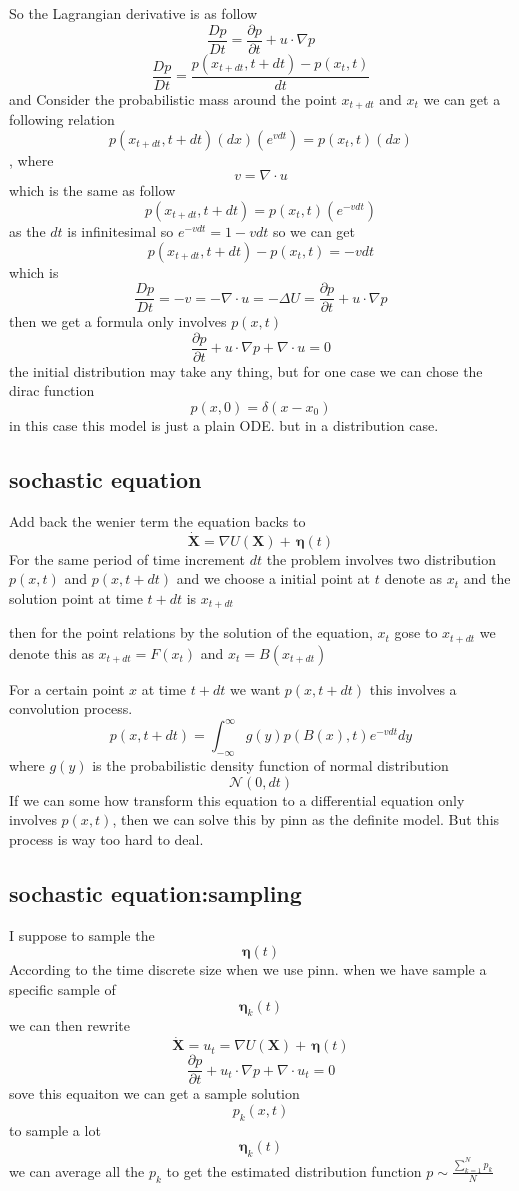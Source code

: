 \documentclass{article}
\theoremstyle{definition} %
\begin{document}
So the Lagrangian derivative
is as follow
\[
    \frac{Dp}{Dt} = \frac{\partial p}{\partial t} + u \cdot \nabla p
\]
\[
    \frac{Dp}{Dt}=\frac{p(x_{t+dt},t+dt)-p(x_{t},t)}{dt}
\]
and Consider the probabilistic mass around the
point \(x_{t+dt}\) and \(x_{t}\) we can get a following
relation
\[p(x_{t+dt},t+dt)(dx)(e^{vdt})=p(x_{t},t)(dx)\],
where \[v=\nabla \cdot u\]
which is the same as follow
\[p(x_{t+dt},t+dt)=p(x_{t},t)(e^{-vdt})\]
as the \(dt\) is infinitesimal so
\(e^{-vdt}=1-vdt\)
so we can get
\[
    p(x_{t+dt},t+dt)-p(x_{t},t)=-vdt
\]
which is
\[
    \frac{Dp}{Dt}=-v=-\nabla \cdot u=-\Delta U=\frac{\partial p}{\partial t} + u \cdot \nabla p
\]
then we get a formula only involves \(p(x,t)\)
\[
    \frac{\partial p}{\partial t} + u \cdot \nabla p +\nabla \cdot u=0
\]
the initial distribution may take any thing,
but for one case we can chose the dirac function
\[
    p(x,0)=\delta(x - x_0)
\]
in this case this model is just a plain
ODE. but in a distribution case.

\subsection{sochastic equation}
Add back the wenier term the equation backs to
\[
    \dot{\mathbf{X}} =  \nabla U(\mathbf{X}) +  \,\boldsymbol{\eta}(t)
\]
For the same period of time increment \(dt\)
the problem involves two distribution
\(p(x,t)\) and \(p(x,t+dt)\)
and we choose a initial point at \(t\)
denote as \(x_t\) and the solution point
at time \(t+dt\) is \(x_{t+dt}\)

then for the point relations by the solution of the
equation, \(x_t\) gose to \(x_{t+dt}\)
we denote this as \(x_{t+dt}=F(x_t)\)
and \(x_{t}=B(x_{t+dt})\)

For a certain point \(x\) at time \(t+dt\)
we want \(p(x,t+dt)\)
this involves a convolution process.
\[
    p(x,t+dt)=\int_{-\infty}^{\infty}g(y)p(B(x),t)e^{-vdt}dy
\]
where $g(y)$ is the probabilistic density function of
normal distribution
\[
    \mathcal{N}(0, dt)
\]
If we can some how transform this equation to a
differential equation only involves
\(p(x,t)\), then we can solve this
by pinn as the definite model.
But this process is way too hard to deal.

\subsection{sochastic equation:sampling}
I suppose to sample the
\[
    \boldsymbol{\eta}(t)
\]
According to the time discrete size when we
use pinn.
when we have sample a specific sample of
\[
    \boldsymbol{\eta}_k(t)
\]
we can then rewrite
\[
    \dot{\mathbf{X}} =  u_t=\nabla U(\mathbf{X}) +  \,\boldsymbol{\eta}(t)
\]
\[
    \frac{\partial p}{\partial t} + u_t \cdot \nabla p +\nabla \cdot u_t=0
\]
sove this equaiton we can get a sample solution
\[
    p_k(x,t)
\]
to sample a lot
\[
    \boldsymbol{\eta}_k(t)
\]
we can average all the \(p_k\)
to get the estimated distribution function
\(p\sim\frac{\sum_{k=1}^{N}p_k}{N}\)









\end{document}
